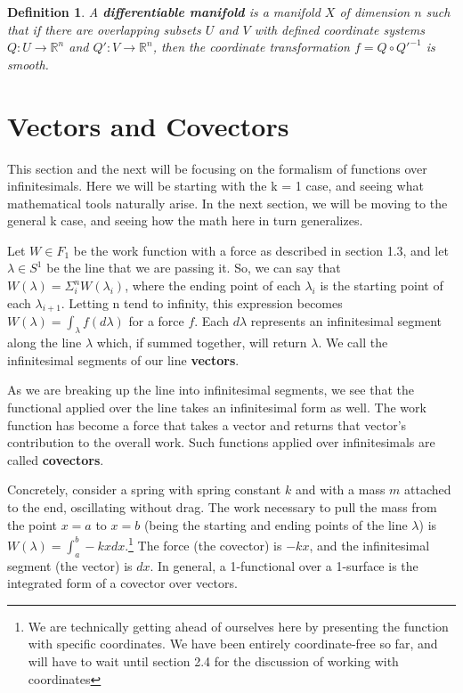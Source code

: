 \documentclass{book}
\newtheorem{defn}[equation]{Definition}
\begin{document}
\begin{defn}
	A \textbf{differentiable manifold} is a manifold $X$ of dimension $n$ such that if there are overlapping subsets $U$ and $V$ with defined coordinate systems $Q: U \to \mathbb{R}^n$ and $Q': V \to \mathbb{R}^n$, then the coordinate transformation $f = Q \circ Q'^{-1}$ is smooth. 
\end{defn}





\section{Vectors and Covectors}


This section and the next will be focusing on the formalism of functions over infinitesimals. Here we will be starting with the k = 1 case, and seeing what mathematical tools naturally arise. In the next section, we will be moving to the general k case, and seeing how the math here in turn generalizes. 


Let $W \in F_1$ be the work function with a force as described in section 1.3, and let $\lambda \in S^1$ be the line that we are passing it. So, we can say that $W(\lambda) = \Sigma^n_iW(\lambda_i)$, where the ending point of each $\lambda_i$ is the starting point of each $\lambda_{i+1}$. Letting n tend to infinity, this expression becomes $W(\lambda) = \int_{\lambda} f(d\lambda)$ for a force $f$. Each $d\lambda$ represents an infinitesimal segment along the line $\lambda$ which, if summed together, will return $\lambda$. We call the infinitesimal segments of our line \textbf{vectors}. 

As we are breaking up the line into infinitesimal segments, we see that the functional applied over the line takes an infinitesimal form as well. The work function has become a force that takes a vector and returns that vector's contribution to the overall work. Such functions applied over infinitesimals are called \textbf{covectors}. 


Concretely, consider a spring with spring constant $k$ and with a mass $m$ attached to the end, oscillating without drag. The work necessary to pull the mass from the point $x = a$ to $x = b$ (being the starting and ending points of the line $\lambda$) is $W(\lambda) = \int_a^b -kx dx$.\footnote{We are technically getting ahead of ourselves here by presenting the function with specific coordinates. We have been entirely coordinate-free so far, and will have to wait until section 2.4 for the discussion of working with coordinates} The force (the covector) is $-kx$, and the infinitesimal segment (the vector) is $dx$. In general, a 1-functional over a 1-surface is the integrated form of a covector over vectors.
\end{document}
